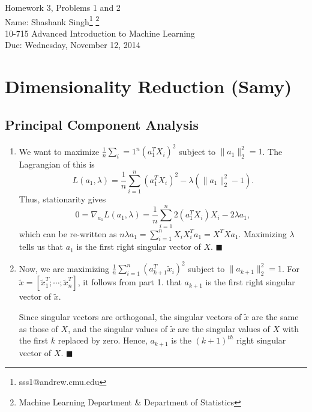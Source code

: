 \documentclass[11pt]{article}
\makeatletter
\newcommand{\myname}{Shashank Singh\footnote{sss1@andrew.cmu.edu}
        \footnote{Machine Learning Department \& Department of Statistics}}
\newcommand{\myclass}{10-715 Advanced Introduction to Machine Learning}
\newcommand{\myhwnum}{3}
\newcommand{\duedate}{Wednesday, November 12, 2014}
\renewcommand{\qed}{\quad \ensuremath{\blacksquare}}
\makeatother
\begin{document}
\thispagestyle{plain}

{\Large Homework \myhwnum, Problems 1 and 2} \\
Name: \myname \\
\myclass \\
Due: \duedate

\section{Dimensionality Reduction (Samy)}
\subsection{Principal Component Analysis}
\begin{enumerate}
\item We want to maximize $\frac1n \sum_i = 1^n (a_1^T X_i)^2$ subject to
$\|a_1\|_2^2 = 1$. The Lagrangian of this is
\[L(a_1,\lambda)
    = \frac1n \sum_{i = 1}^n (a_1^T X_i)^2 - \lambda(\|a_1\|_2^2 - 1).\]
Thus, stationarity gives
\[0
    = \nabla_{a_1} L(a_1, \lambda)
    = \frac1n \sum_{i = 1}^n 2(a_1^T X_i)X_i - 2\lambda a_1,
\]
which can be re-written as
$n\lambda a_1 = \sum_{i = 1}^n X_iX_i^Ta_1 = X^TXa_1$. Maximizing $\lambda$
tells us that $a_1$ is the first right singular vector of $X$. \qed

\item Now, we are maximizing $\frac1n \sum_{i = 1}^n (a_{k + 1}^T \tilde x_i)^2$
subject to $\|a_{k + 1}\|_2^2 = 1$. For
$\tilde x = [\tilde x_1^T;\cdots;\tilde x_n^T]$, it follows from part 1. that
$a_{k + 1}$ is the first right singular vector of $\tilde x$.

Since singular vectors are orthogonal, the singular vectors of $\tilde x$ are
the same as those of $X$, and the singular values of $\tilde x$ are the
singular values of $X$ with the first $k$ replaced by zero. Hence, $a_{k + 1}$
is the $(k + 1)^{th}$ right singular vector of $X$. \qed
\end{enumerate}
\end{document}
